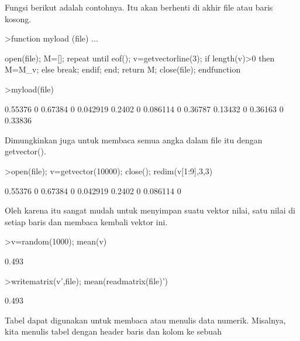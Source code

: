 \documentclass[a4paper,10pt]{article}
\begin{document}
\begin{eulernotebook}
\begin{eulercomment}
\begin{eulercomment}
\begin{eulercomment}
\begin{eulercomment}
\begin{eulercomment}
\begin{eulercomment}
\begin{eulercomment}
\begin{eulercomment}
\begin{eulercomment}
\begin{eulercomment}
\begin{eulercomment}
\begin{eulercomment}
\begin{eulercomment}
\begin{eulercomment}
\begin{eulercomment}
Fungsi berikut adalah contohnya. Itu akan berhenti di akhir file atau
baris kosong.
\end{eulercomment}
\begin{eulerprompt}
>function myload (file) ...
\end{eulerprompt}
\begin{eulerudf}
  open(file);
  M=[];
  repeat
     until eof();
     v=getvectorline(3);
     if length(v)>0 then M=M_v; else break; endif;
  end;
  return M;
  close(file);
  endfunction
\end{eulerudf}
\begin{eulerprompt}
>myload(file)
\end{eulerprompt}
\begin{euleroutput}
    0.55376         0   0.67384         0  0.042919 
     0.2402         0  0.086114         0   0.36787 
    0.13432         0   0.36163         0   0.33836 
\end{euleroutput}
\begin{eulercomment}
Dimungkinkan juga untuk membaca semua angka dalam file itu dengan
getvector().
\end{eulercomment}
\begin{eulerprompt}
>open(file); v=getvector(10000); close(); redim(v[1:9],3,3)
\end{eulerprompt}
\begin{euleroutput}
    0.55376         0   0.67384 
          0  0.042919    0.2402 
          0  0.086114         0 
\end{euleroutput}
\begin{eulercomment}
Oleh karena itu sangat mudah untuk menyimpan suatu vektor nilai, satu
nilai di setiap baris dan membaca kembali vektor ini.
\end{eulercomment}
\begin{eulerprompt}
>v=random(1000); mean(v)
\end{eulerprompt}
\begin{euleroutput}
  0.493
\end{euleroutput}
\begin{eulerprompt}
>writematrix(v',file); mean(readmatrix(file)')
\end{eulerprompt}
\begin{euleroutput}
  0.493
\end{euleroutput}
\begin{eulercomment}
Tabel dapat digunakan untuk membaca atau menulis data numerik.
Misalnya, kita menulis tabel dengan header baris dan kolom ke sebuah

\end{eulercomment}
\end{eulercomment}
\end{eulercomment}
\end{eulercomment}
\end{eulercomment}
\end{eulercomment}
\end{eulercomment}
\end{eulercomment}
\end{eulercomment}
\end{eulercomment}
\end{eulercomment}
\end{eulercomment}
\end{eulercomment}
\end{eulercomment}
\end{eulercomment}
\end{eulernotebook}
\end{document}
